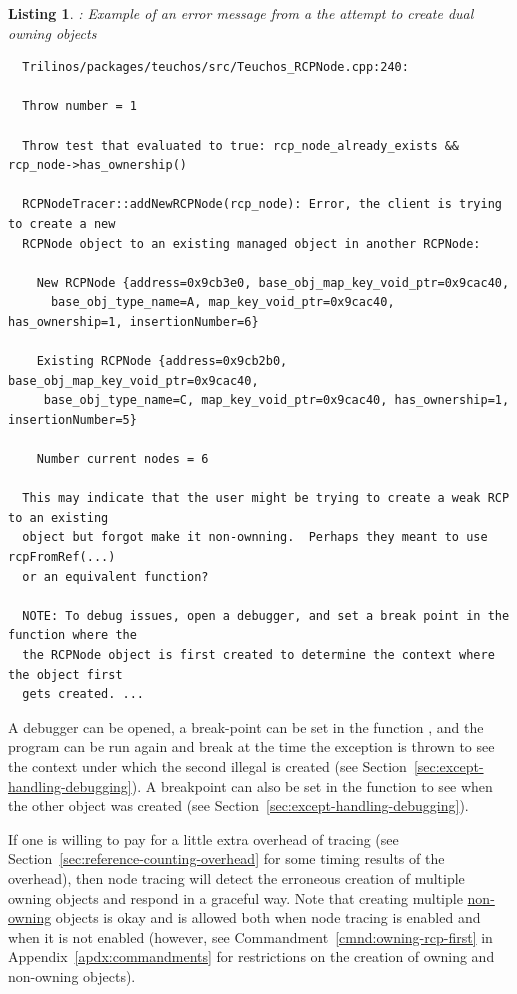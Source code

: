 \documentclass[pdf,ps2pdf,11pt]{SANDreport}
\newtheorem{listing}{Listing}
\begin{document}
{}\begin{listing}: Example of an error message from a the attempt to
create dual owning {} objects
\label{listing:error_msg_dual_owning_rcp_nodes}
{\small\begin{verbatim}
  Trilinos/packages/teuchos/src/Teuchos_RCPNode.cpp:240:
  
  Throw number = 1
  
  Throw test that evaluated to true: rcp_node_already_exists && rcp_node->has_ownership()
  
  RCPNodeTracer::addNewRCPNode(rcp_node): Error, the client is trying to create a new
  RCPNode object to an existing managed object in another RCPNode:
  
    New RCPNode {address=0x9cb3e0, base_obj_map_key_void_ptr=0x9cac40,
      base_obj_type_name=A, map_key_void_ptr=0x9cac40, has_ownership=1, insertionNumber=6}
  
    Existing RCPNode {address=0x9cb2b0, base_obj_map_key_void_ptr=0x9cac40,
     base_obj_type_name=C, map_key_void_ptr=0x9cac40, has_ownership=1, insertionNumber=5}
  
    Number current nodes = 6
  
  This may indicate that the user might be trying to create a weak RCP to an existing
  object but forgot make it non-ownning.  Perhaps they meant to use rcpFromRef(...)
  or an equivalent function?

  NOTE: To debug issues, open a debugger, and set a break point in the function where the
  the RCPNode object is first created to determine the context where the object first
  gets created. ...
\end{verbatim}}
\end{listing}


A debugger can be opened, a break-point can be set in the function {}, and the program can be run again and break at the time the exception is thrown to see the context under which the second illegal {} is created (see Section~\ref{sec:except-handling-debugging}).  A breakpoint can also be set in the function {} to see when the other {} object was created (see Section~\ref{sec:except-handling-debugging}).

If one is willing to pay for a little extra overhead of
{} tracing (see
Section~\ref{sec:reference-counting-overhead} for some timing results
of the overhead), then node tracing will detect the erroneous creation
of multiple owning {} objects and respond in a graceful
way.  Note that creating multiple {}\underline{non-owning}
{} objects is okay and is allowed both when node tracing
is enabled and when it is not enabled (however, see
Commandment~\ref{cmnd:owning-rcp-first} in
Appendix~\ref{apdx:commandments} for restrictions on the creation of
owning and non-owning {} objects).
\end{document}
